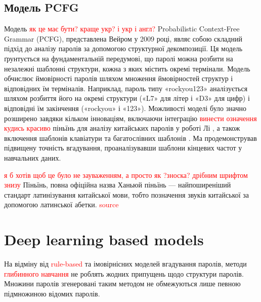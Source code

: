 \subsection{Модель PCFG}
Модель \textcolor{red}{як це має бути? краще укр? і укр і англ?} Probabilistic Context-Free Grammar (PCFG), представлена Вейром \cite{Password cracking using probabilistic context-free grammars} у 2009 році, являє собою складний підхід до аналізу паролів за допомогою структурної декомпозиції. Ця модель ґрунтується на фундаментальній передумові, що паролі можна розбити на незалежні шаблонні структури, кожна з яких містить окремі термінали. Модель обчислює ймовірності паролів шляхом множення ймовірностей структур і відповідних їм терміналів. Наприклад, пароль типу «rockyou123» аналізується шляхом розбиття його на окремі структури («L7» для літер і «D3» для цифр) і відповідні їм закінчення («rockyou» і «123»). Можливості моделі було значно розширено завдяки кільком інноваціям, включаючи інтеграцію \textcolor{red}{винести означення кудись красиво} піньїнь для аналізу китайських паролів у роботі Лі \cite{A large-scale empirical analysis of chinese web passwords}, а також включення шаблонів клавіатури та багатослівних шаблонів \cite{Next gen pcfg password crackingt}. Ма \cite{A study of probabilistic password models} продемонстрував підвищену точність вгадування, проаналізувавши шаблони кінцевих частот у навчальних даних.

\begin{remark}
\textcolor{red}{я б хотів щоб це було не зауваженням, а просто як ?зноска? дрібним шрифтом знизу}
Піньїнь, повна офіційна назва Ханьюй піньїнь — найпоширеніший стандарт латинізування китайської мови, тобто позначення звуків китайської за допомогою латинської абетки. \textcolor{red}{source}
\end{remark}

\section{Deep learning based models}
На відміну від \textcolor{red}{rule-based} та імовірнісних моделей вгадування паролів, методи \textcolor{red}{глибинного навчання} не роблять жодних припущень щодо структури паролів. Множини паролів згенеровані таким методом не обмежуються лише певною підмножиною відомих паролів.

